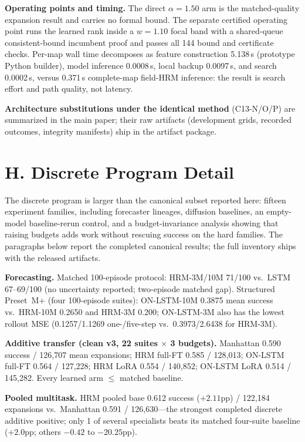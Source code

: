 \documentclass[letterpaper]{article} %
\newcommand{\stage}[1]{\textsc{#1}}
\begin{document}
\textbf{Operating points and timing.} The direct $\alpha{=}1.50$ arm is the matched-quality expansion result and carries no formal bound. The separate certified operating point runs the learned rank inside a $w{=}1.10$ focal band with a shared-queue consistent-bound incumbent proof and passes all 144 bound and certificate checks. Per-map wall time decomposes as feature construction 5.138\,s (prototype Python builder), model inference 0.0008\,s, local backup 0.0097\,s, and search 0.0002\,s, versus 0.371\,s complete-map field-HRM inference: the result is search effort and path quality, not latency.

\textbf{Architecture substitutions under the identical method} (\stage{C13-N/O/P}) are summarized in the main paper; their raw artifacts (development grids, recorded outcomes, integrity manifests) ship in the artifact package.

\section{H. Discrete Program Detail}

The discrete program is larger than the canonical subset reported here: fifteen experiment families, including forecaster lineages, diffusion baselines, an empty-model baseline-rerun control, and a budget-invariance analysis showing that raising budgets adds work without rescuing success on the hard families. The paragraphs below report the completed canonical results; the full inventory ships with the released artifacts.

\textbf{Forecasting.} Matched 100-episode protocol: HRM-3M/10M 71/100 vs.\ LSTM 67--69/100 (no uncertainty reported; two-episode matched gap). Structured Preset~M+ (four 100-episode suites): ON-LSTM-10M 0.3875 mean success vs.\ HRM-10M 0.2650 and HRM-3M 0.200; ON-LSTM-3M also has the lowest rollout MSE (0.1257/1.1269 one-/five-step vs.\ 0.3973/2.6438 for HRM-3M).

\textbf{Additive transfer (clean v3, 22 suites $\times$ 3 budgets).} Manhattan 0.590 success / 126{,}707 mean expansions; HRM full-FT 0.585 / 128{,}013; ON-LSTM full-FT 0.564 / 127{,}228; HRM LoRA 0.554 / 140{,}852; ON-LSTM LoRA 0.514 / 145{,}282. Every learned arm $\leq$ matched baseline.

\textbf{Pooled multitask.} HRM pooled base 0.612 success ($+2.11$pp) / 122{,}184 expansions vs.\ Manhattan 0.591 / 126{,}630---the strongest completed discrete additive positive; only 1 of several specialists beats its matched four-suite baseline ($+2.0$pp; others $-0.42$ to $-20.25$pp).
\end{document}
